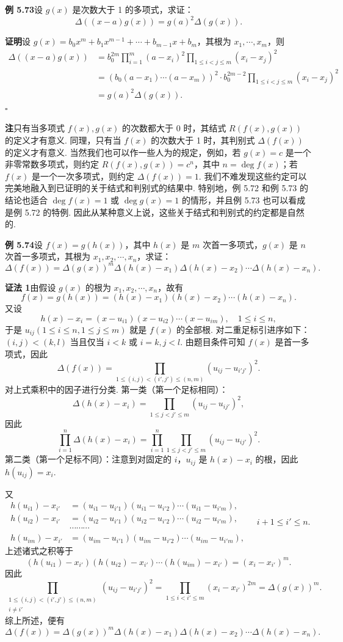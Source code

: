 \documentclass[UTF8,12pt,a4paper,fontset=fandol]{ctexart}
\begin{document}
\noindent\textbf{例 5.73}\quad 设 $g(x)$ 是次数大于 1 的多项式，求证：
\[
\Delta((x-a)g(x))=g(a)^2\Delta(g(x)).
\]

\noindent\textbf{证明}\quad 设 $g(x)=b_0x^m+b_1x^{m-1}+\cdots+b_{m-1}x+b_m$，其根为 $x_1,\cdots,x_m$，则
\[
\begin{aligned}
\Delta((x-a)g(x))
&=b_0^{2m}\prod_{i=1}^m(a-x_i)^2\prod_{1\le i<j\le m}(x_i-x_j)^2\\
&=\left(b_0(a-x_1)\cdots(a-x_m)\right)^2\cdot b_0^{2m-2}\prod_{1\le i<j\le m}(x_i-x_j)^2\\
&=g(a)^2\Delta(g(x)).
\end{aligned}
\]
\hfill $\square$

\noindent\textbf{注}\quad 只有当多项式 $f(x),g(x)$ 的次数都大于 0 时，其结式 $R(f(x),g(x))$ 的定义才有意义. 同理，只有当 $f(x)$ 的次数大于 1 时，其判别式 $\Delta(f(x))$ 的定义才有意义. 当然我们也可以作一些人为的规定，例如，若 $g(x)=c$ 是一个非零常数多项式，则约定 $R(f(x),g(x))=c^n$，其中 $n=\deg f(x)$；若 $f(x)$ 是一个一次多项式，则约定 $\Delta(f(x))=1$. 我们不难发现这些约定可以完美地融入到已证明的关于结式和判别式的结果中. 特别地，例 5.72 和例 5.73 的结论也适合 $\deg f(x)=1$ 或 $\deg g(x)=1$ 的情形，并且例 5.73 也可以看成是例 5.72 的特例. 因此从某种意义上说，这些关于结式和判别式的约定都是自然的.

\noindent\textbf{例 5.74}\quad 设 $f(x)=g(h(x))$，其中 $h(x)$ 是 $m$ 次首一多项式，$g(x)$ 是 $n$ 次首一多项式，其根为 $x_1,x_2,\cdots,x_n$，求证：
\[
\Delta(f(x))=\Delta(g(x))^m\Delta(h(x)-x_1)\Delta(h(x)-x_2)\cdots\Delta(h(x)-x_n).
\]

\noindent\textbf{证法 1}\quad 由假设 $g(x)$ 的根为 $x_1,x_2,\cdots,x_n$，故有
\[
f(x)=g(h(x))=(h(x)-x_1)(h(x)-x_2)\cdots(h(x)-x_n).
\]
又设
\[
h(x)-x_i=(x-u_{i1})(x-u_{i2})\cdots(x-u_{im}),\quad 1\le i\le n,
\]
于是 $u_{ij}(1\le i\le n,1\le j\le m)$ 就是 $f(x)$ 的全部根. 对二重足标引进序如下：$(i,j)<(k,l)$ 当且仅当 $i<k$ 或 $i=k,j<l$. 由题目条件可知 $f(x)$ 是首一多项式，因此
\[
\Delta(f(x))=\prod_{1\le(i,j)<(i',j')\le(n,m)}(u_{ij}-u_{i'j'})^2.
\]
对上式乘积中的因子进行分类. 第一类（第一个足标相同）：
\[
\Delta(h(x)-x_i)=\prod_{1\le j<j'\le m}(u_{ij}-u_{ij'})^2,
\]
因此
\[
\prod_{i=1}^n\Delta(h(x)-x_i)=\prod_{i=1}^n\prod_{1\le j<j'\le m}(u_{ij}-u_{ij'})^2.
\]
第二类（第一个足标不同）：注意到对固定的 $i$，$u_{ij}$ 是 $h(x)-x_i$ 的根，因此 $h(u_{ij})=x_i$.

又
\[
\begin{aligned}
h(u_{i1})-x_{i'}&=(u_{i1}-u_{i'1})(u_{i1}-u_{i'2})\cdots(u_{i1}-u_{i'm}),\\
h(u_{i2})-x_{i'}&=(u_{i2}-u_{i'1})(u_{i2}-u_{i'2})\cdots(u_{i2}-u_{i'm}),\\
&\cdots\cdots\cdots\\
h(u_{im})-x_{i'}&=(u_{im}-u_{i'1})(u_{im}-u_{i'2})\cdots(u_{im}-u_{i'm}),
\end{aligned}
\quad i+1\le i'\le n.
\]
上述诸式之积等于
\[
(h(u_{i1})-x_{i'})(h(u_{i2})-x_{i'})\cdots(h(u_{im})-x_{i'})
=(x_i-x_{i'})^m.
\]
因此
\[
\prod_{\substack{1\le(i,j)<(i',j')\le(n,m)\\ i\ne i'}}(u_{ij}-u_{i'j'})^2
=\prod_{1\le i<i'\le m}(x_i-x_{i'})^{2m}
=\Delta(g(x))^m.
\]
综上所述，便有
\[
\Delta(f(x))=\Delta(g(x))^m\Delta(h(x)-x_1)\Delta(h(x)-x_2)\cdots\Delta(h(x)-x_n).
\]
\end{document}
